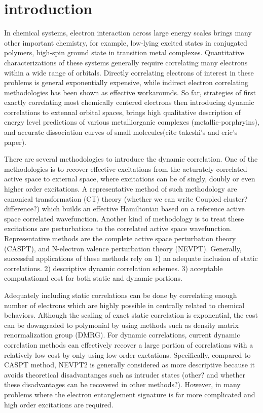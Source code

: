 
\section{introduction}

In chemical systems, electron interaction across large energy scales brings many other important chemistry, for example, 
low-lying excited states in conjugated polymers, high-spin ground state in transition metal complexes. Quantitative 
characterizations of these systems generally require correlating many electrons within a wide range of orbitals. Directly 
correlating electrons of interest in these problems is general exponentially expensive, while indirect electron correlating 
methodologies has been shown as effective workarounds. So far, strategies of first exactly correlating most chemically centered 
electrons then introducing dynamic correlations to extennal orbital spaces, brings high qualitative description of energy level 
predictions of various metalliorganic complexes (metallic-porphryins), and accurate dissociation curves of small molecules(cite 
takeshi's and eric's paper).

There are several methodologies to introduce the dynamic correlation. One of the methodologies is to recover effective excitations from the 
acturately correlated active space to external space, where excitations can be of singly, doubly or even higher order excitations. 
A representative method of such methodology are canonical transformation (CT) theory (whether we can write Coupled cluster? difference?) which builds 
an effective Hamiltonian based on a reference active space correlated wavefunction. Another kind of methodology is to treat these 
excitations are perturbations to the correlated active space wavefunction. Representative methods are the complete active space 
perturbation theory (CASPT), and N-electron valence perturbation theory (NEVPT). Generally, successful applications of 
these methods rely on 1) an adequate inclusion of static correlations. 2) descriptive dynamic correlation schemes. 
3) acceptable computational cost for both static and dynamic portions. 

Adequately including static correlations can be done by correlating enough number of electrons which are highly possible in centrally 
related to chemical behaviors. Although the scaling of exact static correlation is exponential, the cost can be downgraded to 
polymonial by using methods such as density matrix renormalization group (DMRG). For dynamic correlations, current dynamic correlation methods 
can effectively recover a large portion of correlations with a relatively low cost by only using low order exctations. Specifically, compared to CASPT method, 
NEVPT2 is generally considered as more descriptive because it avoids theoretical disadvantanges such as intruder states 
(other? and whether these disadvantages can be recovered in other methods?).
However, in many problems where the electron entanglement signature is far more complicated and high order excitations are required. 

